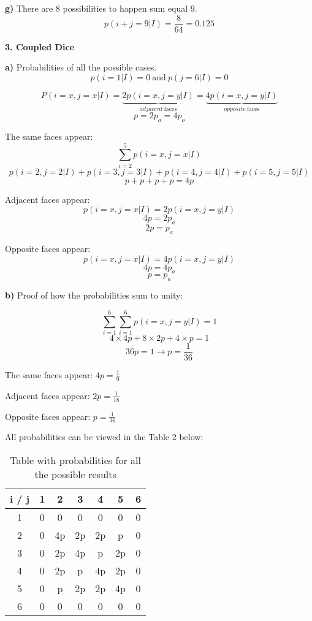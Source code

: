 \documentclass[a4paper, 12pt]{article}
\begin{document}
\begin{flushleft}
\textbf{g)} There are 8 possibilities to happen sum equal 9.
$$ p(i+j=9|I) = \frac{8}{64} = 0.125 $$

\textbf{3. Coupled Dice}

\textbf{a)} Probabilities of all the possible cases.
$$ p(i=1|I) = 0 \ \textrm{and} \ p(j=6|I) = 0 $$

$$ P(i=x, j=x|I) = \underbrace{2p(i=x,j=y|I)}_{adjacent \ \textrm{faces}} = \underbrace{4p(i=x,j=y|I)}_{opposite \ \textrm{faces}}  $$
$$ p = 2p_{a} = 4p_{o} $$

The same faces appear:
$$ \displaystyle\sum_{i=2}^{5} p(i=x, j=x|I) $$
$$ p(i=2, j=2|I) + p(i=3, j=3|I) + p(i=4, j=4|I) + p(i=5, j=5|I) $$
$$ p + p + p + p = 4p $$

Adjacent faces appear: 
$$ p(i=x, j=x|I) = 2p(i=x, j=y|I) $$
$$ 4p = 2p_{a} $$
$$ 2p = p_{a} $$

Opposite faces appear:
$$ p(i=x, j=x|I) = 4p(i=x, j=y|I) $$
$$ 4p = 4p_{a} $$
$$ p = p_{a} $$

\textbf{b)} Proof of how the probabilities sum to unity:

$$ \displaystyle\sum_{i=1}^{6}\displaystyle\sum_{i=1}^{6} p(i=x, j=y|I) = 1 $$
$$ 4 \times 4p + 8 \times 2p + 4 \times p = 1 $$
$$ 36p = 1 \rightarrow p = \frac{1}{36} $$


The same faces appear: $4p = \frac{1}{9}$ 

Adjacent faces appear: $2p = \frac{1}{18}$

Opposite faces appear: $p = \frac{1}{36}$

All probabilities can be viewed in the Table 2 below:

\begin{table}[ht]
    \centering
    \begin{tabular}{| c | c | c | c | c | c | c | }
        \hline
        i / j    & 1 & 2  & 3  & 4  & 5  & 6 \\
        \hline
        1   & 0 & 0  & 0  & 0  & 0  & 0 \\
        \hline
        2   & 0 & 4p & 2p & 2p & p  & 0 \\
        \hline
        3   & 0 & 2p & 4p & p  & 2p & 0 \\
        \hline
        4   & 0 & 2p & p  & 4p & 2p & 0 \\
        \hline
        5   & 0 & p  & 2p & 2p & 4p & 0 \\
        \hline
        6   & 0 & 0  & 0  & 0  & 0  & 0 \\
        \hline
    \end{tabular}
    \caption{Table with probabilities for all the possible results}
    \label{tab:allprob}
\end{table}


\end{flushleft}
\end{document}
